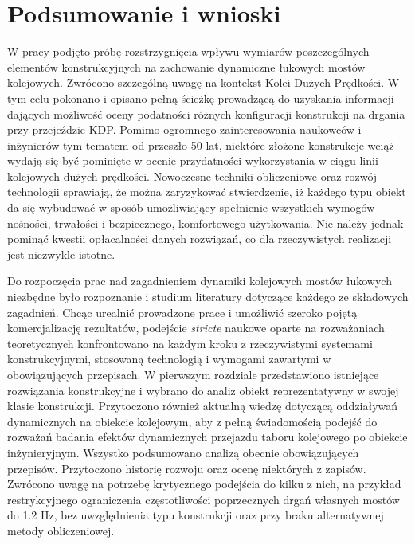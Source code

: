 \chapter*{Podsumowanie i wnioski}

W pracy podjęto próbę rozstrzygnięcia wpływu wymiarów poszczególnych elementów konstrukcyjnych na zachowanie dynamiczne łukowych mostów kolejowych. Zwrócono szczególną uwagę na kontekst Kolei Dużych Prędkości. W tym celu pokonano i opisano pełną ścieżkę prowadzącą do uzyskania informacji dających możliwość oceny podatności różnych konfiguracji konstrukcji na drgania przy przejeździe KDP. Pomimo ogromnego zainteresowania naukowców i inżynierów tym tematem od przeszło 50 lat, niektóre złożone konstrukcje wciąż wydają się być pominięte w ocenie przydatności wykorzystania w ciągu linii kolejowych dużych prędkości. Nowoczesne techniki obliczeniowe oraz rozwój technologii sprawiają, że można zaryzykować stwierdzenie, iż każdego typu obiekt da się wybudować w sposób umożliwiający spełnienie wszystkich wymogów nośności, trwałości i bezpiecznego, komfortowego użytkowania. Nie należy jednak pominąć kwestii opłacalności danych rozwiązań, co dla rzeczywistych realizacji jest niezwykle istotne.

Do rozpoczęcia prac nad zagadnieniem dynamiki kolejowych mostów łukowych niezbędne było rozpoznanie i studium literatury dotyczące każdego ze składowych zagadnień. Chcąc urealnić prowadzone prace i umożliwić szeroko pojętą komercjalizację rezultatów, podejście \textit{stricte} naukowe oparte na rozważaniach teoretycznych konfrontowano na każdym kroku z rzeczywistymi systemami konstrukcyjnymi, stosowaną technologią i wymogami zawartymi w obowiązujących przepisach. W pierwszym rozdziale przedstawiono istniejące rozwiązania konstrukcyjne i wybrano do analiz obiekt reprezentatywny w swojej klasie konstrukcji. Przytoczono również aktualną wiedzę dotyczącą oddziaływań dynamicznych na obiekcie kolejowym, aby z pełną świadomością podejść do rozważań badania efektów dynamicznych przejazdu taboru kolejowego po obiekcie inżynieryjnym. Wszystko podsumowano analizą obecnie obowiązujących przepisów. Przytoczono historię rozwoju oraz ocenę niektórych z zapisów. Zwrócono uwagę na potrzebę krytycznego podejścia do kilku z nich, na przykład restrykcyjnego ograniczenia częstotliwości poprzecznych drgań własnych mostów do 1.2 Hz, bez uwzględnienia typu konstrukcji oraz przy braku alternatywnej metody obliczeniowej.


